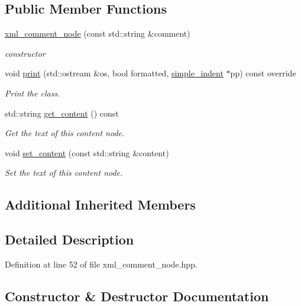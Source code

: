 \subsection*{Public Member Functions}
\begin{DoxyCompactItemize}
\item 
\hyperlink{classxml__comment__node_a03325c9dc5e24e0136768d46542b184d}{xml\+\_\+comment\+\_\+node} (const std\+::string \&comment)
\begin{DoxyCompactList}\small\item\em constructor \end{DoxyCompactList}\item 
void \hyperlink{classxml__comment__node_aadac3ffa2503b92217be8ff569c6c9a2}{print} (std\+::ostream \&os, bool formatted, \hyperlink{classsimple__indent}{simple\+\_\+indent} $\ast$pp) const override
\begin{DoxyCompactList}\small\item\em Print the class. \end{DoxyCompactList}\item 
std\+::string \hyperlink{classxml__comment__node_ae1f14567e56f0c3d70e1b7d05765093a}{get\+\_\+content} () const
\begin{DoxyCompactList}\small\item\em Get the text of this content node. \end{DoxyCompactList}\item 
void \hyperlink{classxml__comment__node_a4f34eb5787506cbfb784fb7c5f927423}{set\+\_\+content} (const std\+::string \&content)
\begin{DoxyCompactList}\small\item\em Set the text of this content node. \end{DoxyCompactList}\end{DoxyCompactItemize}
\subsection*{Additional Inherited Members}


\subsection{Detailed Description}


Definition at line 52 of file xml\+\_\+comment\+\_\+node.\+hpp.



\subsection{Constructor \& Destructor Documentation}
\mbox{\label{classxml__comment__node_a03325c9dc5e24e0136768d46542b184d}} 
